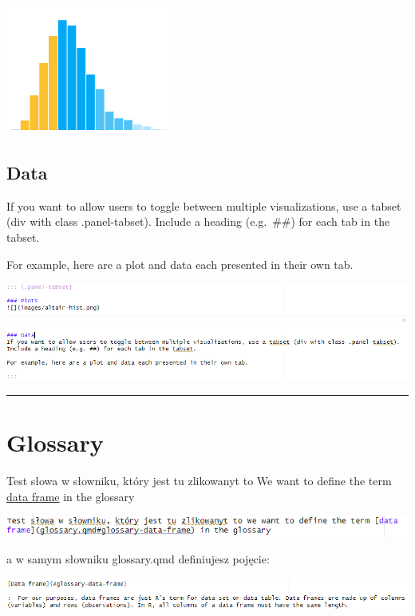 \documentclass[
  a4paper,
  DIV=11,
  numbers=noendperiod,
  oneside,
  open=any]{scrreprt}
\begin{document}
\includegraphics{images/altair-hist.png}

\subsection{Data}

If you want to allow users to toggle between multiple visualizations,
use a tabset (div with class .panel-tabset). Include a heading
(e.g.~\#\#) for each tab in the tabset.

For example, here are a plot and data each presented in their own tab.

\includegraphics{images/_format_tabset.png}

\begin{center}\rule{0.5\linewidth}{0.5pt}\end{center}

\section{Glossary}\label{glossary}

Test słowa w słowniku, który jest tu zlikowanyt to We want to define the
term \hyperref[glossary-data-frame]{data frame} in the glossary

\includegraphics[width=5.28125in,height=\textheight]{images/_format_glossary.png}

a w samym słowniku glossary.qmd definiujesz pojęcie:

\includegraphics{images/_format_glossary2.png}
\end{document}
